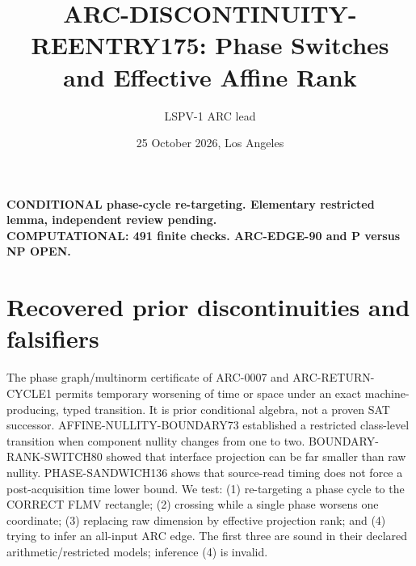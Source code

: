 \documentclass[11pt]{article}
\title{ARC-DISCONTINUITY-REENTRY175: Phase Switches and Effective Affine Rank}
\author{LSPV-1 ARC lead}
\date{25 October 2026, Los Angeles}
\begin{document}
\maketitle
\begin{center}
\textbf{CONDITIONAL phase-cycle re-targeting. Elementary restricted lemma, independent review pending.}\\
\textbf{COMPUTATIONAL: 491 finite checks. ARC-EDGE-90 and P versus NP OPEN.}
\end{center}
\section{Recovered prior discontinuities and falsifiers}
The phase graph/multinorm certificate of ARC-0007 and ARC-RETURN-CYCLE1
permits temporary worsening of time or space under an exact
machine-producing, typed transition. It is prior conditional algebra,
not a proven SAT successor. AFFINE-NULLITY-BOUNDARY73 established a
restricted class-level transition when component nullity changes
from one to two. BOUNDARY-RANK-SWITCH80 showed that interface
projection can be far smaller than raw nullity.
PHASE-SANDWICH136 shows that source-read timing does not
force a post-acquisition time lower bound.
We test: (1) re-targeting a phase cycle to the CORRECT
FLMV rectangle; (2) crossing while a single phase worsens
one coordinate; (3) replacing raw dimension by effective
projection rank; and (4) trying to infer an all-input
ARC edge. The first three are sound in their declared
arithmetic/restricted models; inference (4) is invalid.
\end{document}
